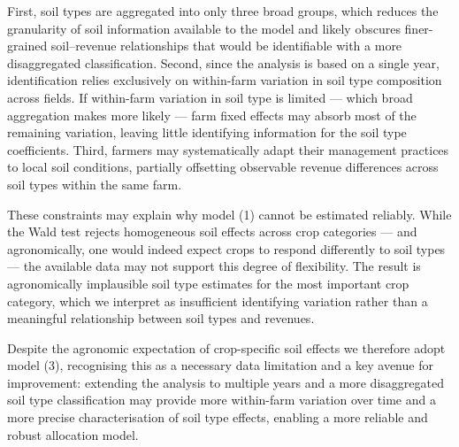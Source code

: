 \documentclass[12pt]{article}
\begin{document}
First, soil types are aggregated into only three broad groups, which reduces the granularity of soil information available to the model and likely obscures finer-grained soil--revenue relationships that would be identifiable with a more disaggregated classification.
Second, since the analysis is based on a single year, identification relies exclusively on within-farm variation in soil type composition across fields.
If within-farm variation in soil type is limited --- which broad 
aggregation makes more likely --- farm fixed effects may absorb most of the remaining variation, leaving little identifying information for the soil type coefficients.
Third, farmers may systematically adapt their management practices to local soil conditions, partially offsetting observable revenue differences across soil types within the same farm.

These constraints may explain why model (1) cannot be estimated reliably.
While the Wald test rejects homogeneous soil effects across crop categories --- and agronomically, one would indeed expect crops to respond differently to soil types --- the available data may not support this degree of flexibility.
The result is agronomically implausible soil type estimates for the most important crop category, which we interpret as insufficient identifying variation rather than a meaningful relationship between soil types and revenues. 

Despite the agronomic expectation of crop-specific soil effects we therefore adopt model (3), recognising this as a necessary data limitation and a key avenue for improvement: extending the analysis to multiple years and a more disaggregated soil type classification may provide more within-farm variation over time and a more precise characterisation of soil type effects, enabling a more reliable and robust allocation model.


\end{document}
